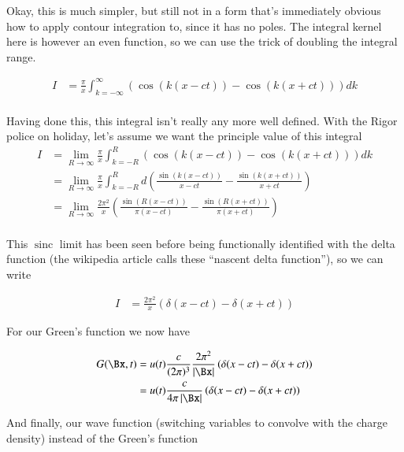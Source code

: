 \documentclass{article}
\DeclareMathOperator{\sinc}{sinc}
\begin{document}
Okay, this is much simpler, but still not in a form that's immediately obvious how to apply contour integration to, since it has no poles.
The integral
kernel here is however an even function,
so we can use the trick of doubling the integral range.

\begin{align*}
I &= \frac{\pi }{x} \int_{k=-\infty}^\infty \left( \cos\left( k (x-c t) \right) -\cos\left( k (x+c t) \right) \right) dk \\
\end{align*}

Having done this, this integral isn't really any more well defined.  With the Rigor police on holiday, let's assume we want the
principle value of this integral
\begin{align*}
I 
&= \lim_{R \rightarrow \infty} \frac{\pi }{x} \int_{k=-R}^R \left( \cos\left( k (x-c t) \right) -\cos\left( k (x+c t) \right) \right) dk \\
&= \lim_{R \rightarrow \infty} \frac{\pi }{x} \int_{k=-R}^R d \left( \frac{\sin\left( k (x-c t) \right)}{ x - c t} - \frac{\sin\left( k (x+c t) \right)}{x + c t} \right) \\
&= \lim_{R \rightarrow \infty} \frac{2 \pi^2 }{x} \left( \frac{\sin\left( R (x-c t) \right)}{ \pi(x - c t)} - \frac{\sin\left( R (x+c t) \right)}{\pi(x + c t)} \right) \\
\end{align*}

This $\sinc$ limit has been seen before being functionally identified with the delta function (the wikipedia article calls these ``nascent delta function''), so we can write

\begin{align*}
I &= \frac{2 \pi^2 }{x} \left( \delta(x-c t) - \delta(x+c t) \right)
\end{align*}

For our Green's function we now have

\begin{align*}
G(\Bx, t) 
&= u(t) \frac{c }{(2\pi)^3} \frac{2 \pi^2 }{\Abs{\Bx}} \left( \delta(x-c t) - \delta(x+c t) \right) \\
&= u(t) \frac{c }{4\pi \Abs{\Bx}} \left( \delta(x-c t) - \delta(x+c t) \right) \\
\end{align*}

And finally, our wave function (switching variables to convolve with the charge density) instead of the Green's function
\end{document}
